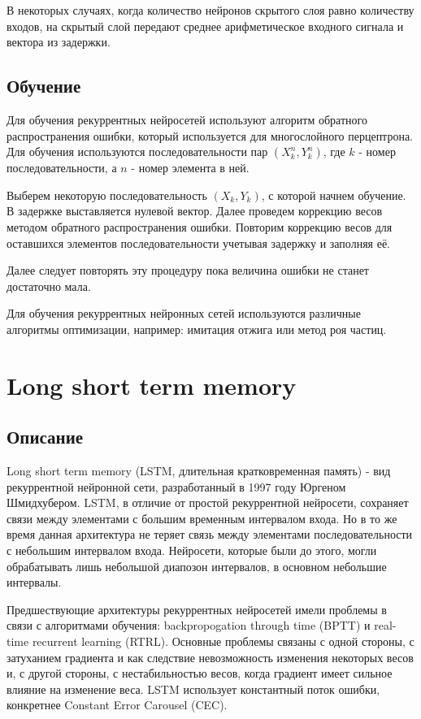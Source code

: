 \documentclass[14pt]{article}
\begin{document}
В некоторых случаях, когда количество нейронов скрытого слоя равно количеству входов, на скрытый слой передают среднее арифметическое входного сигнала и вектора из задержки.
\subsection{Обучение}
Для обучения рекуррентных нейросетей используют алгоритм обратного распространения ошибки, который используется для многослойного перцептрона. Для обучения используются последовательности пар $(X_k^n, Y_k^n)$, где $k$ - номер последовательности, а $n$ - номер элемента в ней.


Выберем некоторую последовательность $(X_k, Y_k)$, с которой начнем обучение. В задержке выставляется нулевой вектор. Далее проведем коррекцию весов методом обратного распространения ошибки. Повторим коррекцию весов для оставшихся элементов последовательности учетывая задержку и заполняя её.


Далее следует повторять эту процедуру пока величина ошибки не станет достаточно мала.


Для обучения рекуррентных нейронных сетей используются различные алгоритмы оптимизации, например: имитация отжига или метод роя частиц.

\section{Long short term memory}

\subsection{Описание}
Long short term memory (LSTM, длительная кратковременная память) - вид рекуррентной нейронной сети, разработанный в 1997 году Юргеном Шмидхубером. LSTM, в отличие от простой рекуррентной нейросети, сохраняет связи между элементами с большим временным интервалом входа. Но в то же время данная архитектура не теряет связь между элементами последовательности с небольшим интервалом входа. Нейросети, которые были до этого, могли обрабатывать лишь небольшой диапозон интервалов, в основном небольшие интервалы.


Предшествующие архитектуры рекуррентных нейросетей имели проблемы в связи с алгоритмами обучения: backpropogation through time (BPTT) и real-time recurrent learning (RTRL). Основные проблемы связаны с одной стороны, с затуханием градиента и как следствие невозможность изменения некоторых весов и, с другой стороны, с нестабильностью весов, когда градиент имеет сильное влияние на изменение веса. LSTM использует константный поток ошибки, конкретнее Constant Error Carousel (CEC).
\end{document}
